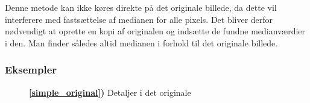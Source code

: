 {Denne metode kan ikke køres direkte på det originale billede, da dette
vil interferere med fastsættelse af medianen for alle pixels. Det bliver
derfor nødvendigt at oprette en kopi af originalen og indsætte de fundne
medianværdier i den. Man finder således altid medianen i forhold til det
originale billede.

\subsubsection*{Eksempler}

\begin{figure}[!h]
    \centering
    \hspace{1em}
    \hspace{1em}
    \caption[]{
        \textbf{\ref{simple_original})} Detaljer i det originale
}
\end{figure}}
